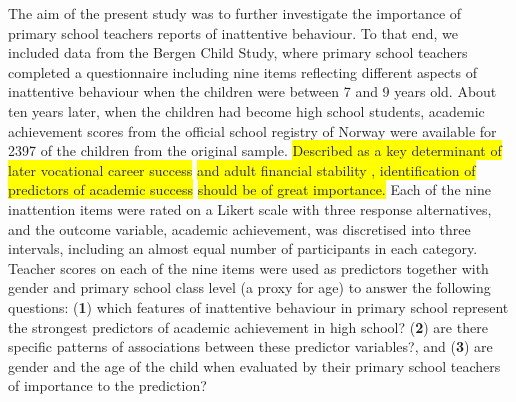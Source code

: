 \documentclass[10pt,letterpaper]{article}
\begin{document}
The aim of the present study was to further investigate the importance of primary school teachers reports of inattentive behaviour. To that end, we included data from the Bergen Child Study, where primary school teachers completed a questionnaire including nine items reflecting different aspects of inattentive behaviour when the children were between 7 and 9 years old. About ten years later, when the children had become high school students, academic achievement scores from the official school registry of Norway were available for 2397 of the children from the original sample. \colorbox{yellow}{Described as a key determinant of later vocational career success} \colorbox{yellow}{and adult
financial stability \cite{Fried2016}, identification of predictors of
academic success} \colorbox{yellow}{should be of great importance.} Each of the nine inattention items were rated on a Likert scale with three response alternatives, and the outcome variable, academic achievement, was discretised into three intervals, including an almost equal number of participants in each category.  Teacher scores on each of the nine items were used as predictors together with gender and primary school class level (a proxy for age) to answer the following questions: ({\bf1}) which features of inattentive behaviour in primary school represent the strongest predictors of academic achievement in high school? ({\bf 2}) are there specific patterns of associations between these predictor variables?, and ({\bf3}) are gender and the age of the child when evaluated by their primary school teachers of importance to the prediction?  \\ 
\end{document}
